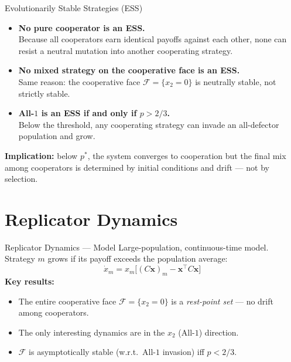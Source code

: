 \documentclass[aspectratio=169]{beamer}
\begin{document}
\begin{frame}{Evolutionarily Stable Strategies (ESS)}
  \begin{itemize}
    \item \textbf{No pure cooperator is an ESS.}\\
      Because all cooperators earn identical payoffs against each other, none can resist a neutral mutation into another cooperating strategy.
    \item \textbf{No mixed strategy on the cooperative face is an ESS.}\\
      Same reason: the cooperative face $\mathcal{F} = \{x_2 = 0\}$ is neutrally stable, not strictly stable.
    \item \textbf{All-$1$ is an ESS if and only if $p > 2/3$.}\\
      Below the threshold, any cooperating strategy can invade an all-defector population and grow.
  \end{itemize}
  \vspace{6pt}
  \textbf{Implication:} below $p^*$, the system converges to cooperation but the final mix among cooperators is determined by initial conditions and drift --- not by selection.
\end{frame}

\section{Replicator Dynamics}

\begin{frame}{Replicator Dynamics --- Model}
  Large-population, continuous-time model.
  Strategy $m$ grows if its payoff exceeds the population average:
  \[
    \dot{x}_m = x_m \bigl[(C\mathbf{x})_m - \mathbf{x}^\top C \mathbf{x}\bigr]
  \]
  \textbf{Key results:}
  \begin{itemize}
    \item The entire cooperative face $\mathcal{F} = \{x_2 = 0\}$ is a \emph{rest-point set} --- no drift among cooperators.
    \item The only interesting dynamics are in the $x_2$ (All-$1$) direction.
    \item $\mathcal{F}$ is asymptotically stable (w.r.t.\ All-$1$ invasion) iff $p < 2/3$.
  \end{itemize}
\end{frame}
\end{document}
